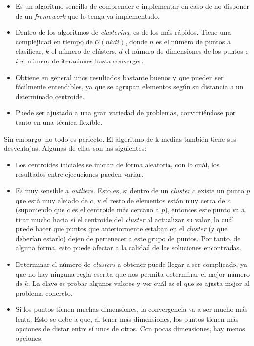 \documentclass[11pt,a4paper]{article}
\begin{document}
\begin{itemize}
	\item Es un algoritmo sencillo de comprender e implementar en caso de no disponer de un \textit{framework} que lo tenga
	ya implementado.
	\item Dentro de los algoritmos de \textit{clustering}, es de los más rápidos. Tiene una complejidad en tiempo de
	$\mathcal{O}(nkdi)$, donde $n$ es el número de puntos a clasificar, $k$ el número de clústers, $d$ el número de
	dimensiones de los puntos e $i$ el número de iteraciones hasta converger.
	\item Obtiene en general unos resultados bastante buenos y que pueden ser fácilmente entendibles, ya que se agrupan
	elementos según su distancia a un determinado centroide.
	\item Puede ser ajustado a una gran variedad de problemas, convirtiéndose por tanto en una técnica flexible.
\end{itemize}

Sin embargo, no todo es perfecto. El algoritmo de k-medias también tiene sus desventajas. Algunas de ellas son las siguientes:

\begin{itemize}
	\item Los centroides iniciales se inician de forma aleatoria, con lo cuál, los resultados entre ejecuciones pueden variar.
	\item Es muy sensible a \textit{outliers}. Esto es, si dentro de un \textit{cluster} $c$ existe un punto $p$ que está muy
	alejado de $c$, y el resto de elementos están muy cerca de $c$ (suponiendo que $c$ es el centroide más cercano
	a $p$), entonces este punto va a tirar mucho hacia sí el centroide del \textit{cluster} al actualizar su valor, lo cuál
	puede hacer que puntos que anteriormente estaban en el \textit{cluster} (y que deberían estarlo) dejen de pertenecer a
	este grupo de puntos. Por tanto, de alguna forma, esto puede afectar a la calidad de las soluciones encontradas.
	\item Determinar el número de \textit{clusters} a obtener puede llegar a ser complicado, ya que no hay ninguna regla escrita
	que nos permita determinar el mejor número de $k$. La clave es probar algunos valores y ver cuál es el que se ajusta
	mejor al problema concreto.
	\item Si los puntos tienen muchas dimensiones, la convergencia va a ser mucho más lenta. Esto se debe a que, al tener más
	dimensiones, los puntos tienen más opciones de distar entre sí unos de otros. Con pocas dimensiones, hay menos opciones.
\end{itemize}
\end{document}
